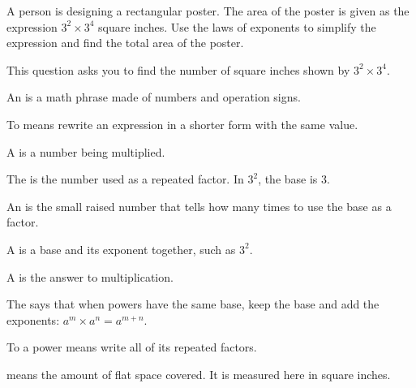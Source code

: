 

A person is designing a rectangular poster. The area of the poster is given as
the expression $3^{2} \times 3^{4}$ square inches. Use the laws of exponents to
simplify the expression and find the total area of the poster.


This question asks you to find the number of square inches shown by
$3^{2} \times 3^{4}$.

\begin{words}
  \item An is a math phrase made of numbers and operation signs.
  \item To means rewrite an expression in a shorter form with the
    same value.
  \item A is a number being multiplied.
  \item The is the number used as a repeated factor. In $3^{2}$, the
    base is 3.
  \item An is the small raised number that tells how many times to
    use the base as a factor.
  \item A is a base and its exponent together, such as $3^{2}$.
  \item A is the answer to multiplication.
  \item The says that when powers have the same base,
    keep the base and add the exponents: $a^{m} \times a^{n} = a^{m+n}$.
  \item To a power means write all of its repeated factors.
  \item {}means the amount of flat space covered. It is measured here in
    square inches.
\end{words}

